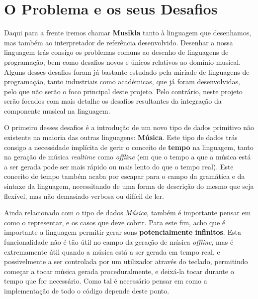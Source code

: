\chapter{O Problema e os seus Desafios}
Daqui para a frente iremos chamar \textbf{Musikla} tanto à linguagem que desenhamos, mas também ao interpretador de referência desenvolvido. Desenhar a nossa linguagem trás consigo os problemas comuns ao desenho de linguagens de programação, bem como desafios novos e únicos relativos ao domínio musical. Alguns desses desafios foram já bastante estudado pela miríade de linguagens de programação, tanto industriais como académicas, que já foram desenvolvidas, pelo que não serão o foco principal deste projeto. Pelo contrário, neste projeto serão focados com mais detalhe os desafios resultantes da integração da componente musical na linguagem.

O primeiro desses desafios é a introdução de um novo tipo de dados primitivo não existente na maioria das outras linguagens: \textbf{Música}. Este tipo de dados trás consigo a necessidade implícita de gerir o conceito de \textbf{tempo} na linguagem, tanto na geração de música \textit{realtime} como \textit{offline} (em que o tempo a que a música está a ser gerada pode ser mais rápido ou mais lento do que o tempo real). Este conceito de tempo também acaba por escapar para o campo da gramática e da sintaxe da linguagem, necessitando de uma forma de descrição do mesmo que seja flexível, mas não demasiado verbosa ou difícil de ler.

Ainda relacionado com o tipo de dados \textit{Música}, também é importante pensar em como o representar, e os casos que deve cobrir. Para este fim, acho que é importante a linguagem permitir gerar sons \textbf{potencialmente infinitos}. Esta funcionalidade não é tão útil no campo da geração de música \textit{offline}, mas é extremamente útil quando a música está a ser gerada em tempo real, e possivelmente a ser controlada por um utilizador através do teclado, permitindo começar a tocar música gerada proceduralmente, e deixá-la tocar durante o tempo que for necessário. Como tal é necessário pensar em como a implementação de todo o código depende deste ponto.

